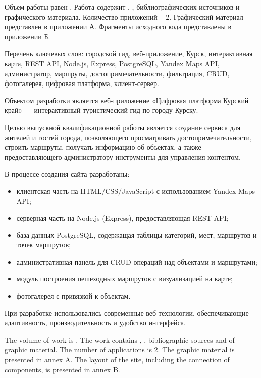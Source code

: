 
Объем работы равен . Работа содержит , ,  библиографических источников и  графического материала. Количество приложений – 2. Графический материал представлен в приложении А. Фрагменты исходного кода представлены в приложении Б.

Перечень ключевых слов: городской гид, веб-приложение, Курск, интерактивная карта, REST API, Node.js, Express, PostgreSQL, Yandex Maps API, администратор, маршруты, достопримечательности, фильтрация, CRUD, фотогалерея, цифровая платформа, клиент-сервер.

Объектом разработки является веб-приложение «Цифровая платформа Курский край» — интерактивный туристический гид по городу Курску.

Целью выпускной квалификационной работы является создание сервиса для жителей и гостей города, позволяющего просматривать достопримечательности, строить маршруты, получать информацию об объектах, а также предоставляющего администратору инструменты для управления контентом.

В процессе создания сайта разработаны:
\begin{itemize}
	\item клиентская часть на HTML/CSS/JavaScript с использованием Yandex Maps API;
	\item серверная часть на Node.js (Express), предоставляющая REST API;
	\item база данных PostgreSQL, содержащая таблицы категорий, мест, маршрутов и точек маршрутов;
	\item административная панель для CRUD-операций над объектами и маршрутами;
	\item модуль построения пешеходных маршрутов с визуализацией на карте;
	\item фотогалерея с привязкой к объектам.
\end{itemize}

При разработке использовались современные веб-технологии, обеспечивающие адаптивность, производительность и удобство интерфейса.

  
The volume of work is . The work contains , ,  bibliographic sources and  of graphic material. The number of applications is 2. The graphic material is presented in annex A. The layout of the site, including the connection of components, is presented in annex B.

